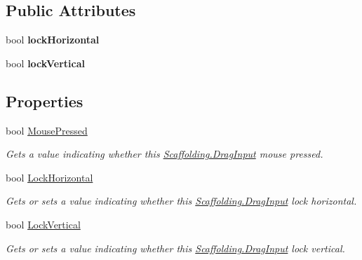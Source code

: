 \subsection*{Public Attributes}
\begin{DoxyCompactItemize}
\item 
\hypertarget{class_scaffolding_1_1_drag_input_a4f032b5cb00663f311d36154fb8e64a3}{bool {\bfseries lock\+Horizontal}}\label{class_scaffolding_1_1_drag_input_a4f032b5cb00663f311d36154fb8e64a3}

\item 
\hypertarget{class_scaffolding_1_1_drag_input_ab1eb142a4d7572c0c1cc36b2a50d7eee}{bool {\bfseries lock\+Vertical}}\label{class_scaffolding_1_1_drag_input_ab1eb142a4d7572c0c1cc36b2a50d7eee}

\end{DoxyCompactItemize}
\subsection*{Properties}
\begin{DoxyCompactItemize}
\item 
bool \hyperlink{class_scaffolding_1_1_drag_input_ab8e2d83d121fbd2b3ad60ef23fe5332f}{Mouse\+Pressed}
\begin{DoxyCompactList}\small\item\em Gets a value indicating whether this \hyperlink{class_scaffolding_1_1_drag_input}{Scaffolding.\+Drag\+Input} mouse pressed. \end{DoxyCompactList}\item 
bool \hyperlink{class_scaffolding_1_1_drag_input_ab13911d3778d99a0687b7bf724adb42d}{Lock\+Horizontal}
\begin{DoxyCompactList}\small\item\em Gets or sets a value indicating whether this \hyperlink{class_scaffolding_1_1_drag_input}{Scaffolding.\+Drag\+Input} lock horizontal. \end{DoxyCompactList}\item 
bool \hyperlink{class_scaffolding_1_1_drag_input_a5efcdda6db82447e4e61490c85977180}{Lock\+Vertical}
\begin{DoxyCompactList}\small\item\em Gets or sets a value indicating whether this \hyperlink{class_scaffolding_1_1_drag_input}{Scaffolding.\+Drag\+Input} lock vertical. \end{DoxyCompactList}\end{DoxyCompactItemize}


